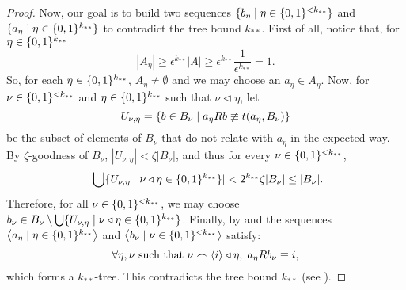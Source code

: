 \begin{lemma}
\begin{proof}
                Now, our goal is to build two sequences $\{ b_\eta \mid \eta \in \{ 0,1 \}^{<k_{**}} \}$ and
                $\{ a_\eta \mid \eta \in \{ 0,1 \}^{k_{**}} \}$ to contradict the tree bound $k_{**}$.
                First of all, notice that, for $\eta \in \{ 0,1 \}^{k_{**}}$
                \[
                    |A_\eta| \geq \epsilon^{k_{**}} |A| \geq
                    \epsilon^{k_{**}} \frac{1}{\epsilon^{k_{**}}} = 1.
                \]
                So, for each $\eta \in \{ 0,1 \}^{k_{**}}$, $A_\eta \neq \emptyset$ and we may choose an $a_\eta \in A_\eta$.
                Now, for $\nu \in \{ 0,1 \}^{<k_{**}}$ and $\eta \in \{ 0,1 \}^{k_{**}}$ such that $\nu \triangleleft \eta$, let
                \[
                    U_{\nu,\eta} = \{ b \in B_\nu \mid a_\eta R b \not\equiv t(a_\eta, B_\nu) \}
                \]
                be the subset of elements of $B_\nu$ that do not relate with $a_\eta$ in the expected way.
                By $\zeta$-goodness of $B_\nu$, $|U_{\nu, \eta}| < \zeta |B_\nu|$, and thus for every $\nu \in \{ 0,1 \}^{<k_{**}}$,
                \[
                    | \bigcup\{  U_{\nu,\eta} \mid \nu \triangleleft \eta \in \{ 0,1 \}^{k_{**}} \} | <
                    2^{k_{**}} \zeta |B_\nu| \leq |B_\nu|.
                \]
                Therefore, for all $\nu \in \{ 0,1 \}^{<k_{**}}$, we may choose
                $b_\nu \in B_\nu \setminus \bigcup\{ U_{\nu,\eta} \mid \nu \triangleleft \eta \in \{ 0,1 \}^{k_{**}} \}$.
                Finally, by  and 
                the sequences $\left< a_\eta \mid \eta \in \{ 0,1 \}^{k_{**}} \right>$ and $\left< b_\nu \mid \nu \in \{ 0,1 \}^{<k_{**}} \right>$
                satisfy:
                \[
                    \forall \eta, \nu \text{ such that } \nu \frown \left< i \right> \triangleleft \eta, \; a_\eta R b_\nu \equiv i,
                \]
                which forms a $k_{**}$-tree.
                This contradicts the tree bound $k_{**}$ (see ).
            \end{proof}
        \end{lemma}

